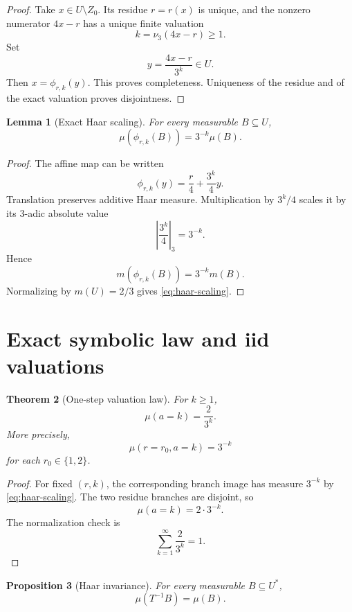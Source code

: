 \documentclass[11pt]{article}
\newtheorem{theorem}{Theorem}[section]
\newtheorem{proposition}[theorem]{Proposition}
\newtheorem{lemma}[theorem]{Lemma}
\theoremstyle{definition}
\theoremstyle{remark}
\newcommand{\vthree}{\nu_3}
\newcommand{\Ustar}{U^\ast}
\begin{document}
\begin{proof}
Take $x\in U\setminus Z_0$.  Its residue $r=r(x)$ is unique, and the nonzero numerator $4x-r$ has a unique finite valuation
\[
k=\vthree(4x-r)\ge1.
\]
Set
\[
y=\frac{4x-r}{3^k}\in U.
\]
Then $x=\phi_{r,k}(y)$.  This proves completeness.  Uniqueness of the residue and of the exact valuation proves disjointness.
\end{proof}

\begin{lemma}[Exact Haar scaling]
For every measurable $B\subseteq U$,
\begin{equation}
\boxed{\mu(\phi_{r,k}(B))=3^{-k}\mu(B).}
\label{eq:haar-scaling}
\end{equation}
\end{lemma}

\begin{proof}
The affine map can be written
\[
\phi_{r,k}(y)=\frac r4+\frac{3^k}{4}y.
\]
Translation preserves additive Haar measure.  Multiplication by $3^k/4$ scales it by its $3$-adic absolute value
\[
\left|\frac{3^k}{4}\right|_3=3^{-k}.
\]
Hence
\[
m(\phi_{r,k}(B))=3^{-k}m(B).
\]
Normalizing by $m(U)=2/3$ gives \eqref{eq:haar-scaling}.
\end{proof}

\section{Exact symbolic law and iid valuations}

\begin{theorem}[One-step valuation law]
For $k\ge1$,
\begin{equation}
\boxed{\mu(a=k)=\frac{2}{3^k}.}
\label{eq:geom-law}
\end{equation}
More precisely,
\begin{equation}
\boxed{\mu(r=r_0,a=k)=3^{-k}}
\label{eq:joint-one-step}
\end{equation}
for each $r_0\in\{1,2\}$.
\end{theorem}

\begin{proof}
For fixed $(r,k)$, the corresponding branch image has measure $3^{-k}$ by \eqref{eq:haar-scaling}.  The two residue branches are disjoint, so
\[
\mu(a=k)=2\cdot3^{-k}.
\]
The normalization check is
\[
\sum_{k=1}^\infty\frac{2}{3^k}=1.
\]
\end{proof}

\begin{proposition}[Haar invariance]
For every measurable $B\subseteq\Ustar$,
\begin{equation}
\boxed{\mu(T^{-1}B)=\mu(B).}
\label{eq:haar-invariance}
\end{equation}
\end{proposition}
\end{document}
